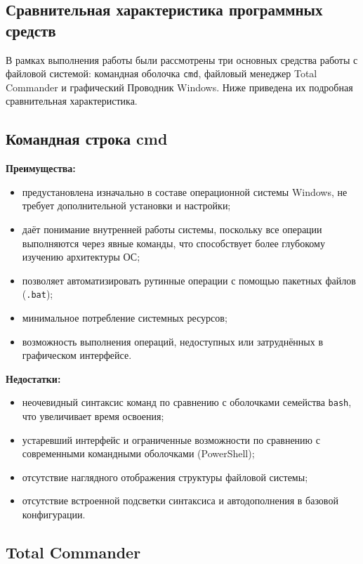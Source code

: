 \documentclass[oneside,a4paper,14pt]{extarticle}
\begin{document}
\begin{small}\section*{Сравнительная характеристика программных средств}

	В рамках выполнения работы были рассмотрены три основных средства работы с файловой системой: командная оболочка \texttt{cmd}, файловый менеджер Total Commander и графический Проводник Windows. Ниже приведена их подробная сравнительная характеристика.
	\subsection*{Командная строка cmd}

	\textbf{Преимущества:}
	\begin{itemize}
		\item предустановлена изначально в составе операционной системы Windows, не требует дополнительной установки и настройки;
		\item даёт понимание внутренней работы системы, поскольку все операции выполняются через явные команды, что способствует более глубокому изучению архитектуры ОС;
		\item позволяет автоматизировать рутинные операции с помощью пакетных файлов (\texttt{.bat});
		\item минимальное потребление системных ресурсов;
		\item возможность выполнения операций, недоступных или затруднённых в графическом интерфейсе.
	\end{itemize}

	\textbf{Недостатки:}
	\begin{itemize}
		\item неочевидный синтаксис команд по сравнению с оболочками семейства \texttt{bash}, что увеличивает время освоения;
		\item устаревший интерфейс и ограниченные возможности по сравнению с современными командными оболочками (PowerShell);
		\item отсутствие наглядного отображения структуры файловой системы;
		\item отсутствие встроенной подсветки синтаксиса и автодополнения в базовой конфигурации.
	\end{itemize}
	\newpage
	\subsection*{Total Commander}


\end{small}
\end{document}

